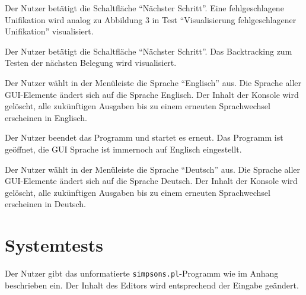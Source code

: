 \documentclass[parskip=full,11pt,twoside]{scrartcl}
\begin{document}

{Der Nutzer betätigt die Schaltfläche \enquote{Nächster Schritt}.}
{Eine fehlgeschlagene Unifikation wird analog zu Abbildung 3 in Test \enquote{Visualisierung fehlgeschlagener Unifikation} visualisiert.}


{Der Nutzer betätigt die Schaltfläche \enquote{Nächster Schritt}.}
{Das Backtracking zum Testen der nächsten Belegung wird visualisiert.}


{Der Nutzer wählt in der Menüleiste die Sprache \enquote{Englisch} aus.}
{Die Sprache aller GUI-Elemente ändert sich auf die Sprache Englisch. Der Inhalt der Konsole wird gelöscht, alle zukünftigen Ausgaben bis zu einem erneuten Sprachwechsel erscheinen in Englisch.}

{Der Nutzer beendet das Programm und startet es erneut.}
{Das Programm ist geöffnet, die GUI Sprache ist immernoch auf Englisch eingestellt.}

{Der Nutzer wählt in der Menüleiste die Sprache \enquote{Deutsch} aus.}
{Die Sprache aller GUI-Elemente ändert sich auf die Sprache Deutsch. Der Inhalt der Konsole wird gelöscht, alle zukünftigen Ausgaben bis zu einem erneuten Sprachwechsel erscheinen in Deutsch.}

\section{Systemtests}


{Der Nutzer gibt das unformatierte \texttt{simpsons.pl}-Programm wie im Anhang beschrieben ein.}
{Der Inhalt des Editors wird entsprechend der Eingabe geändert.}
\end{document}
